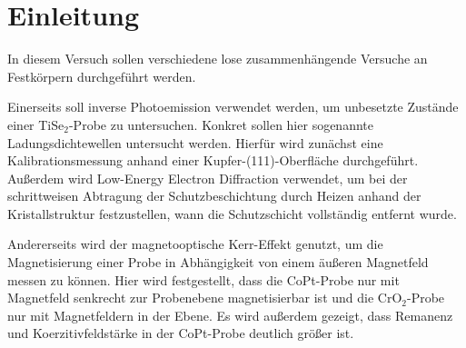 \section{Einleitung}

  In diesem Versuch sollen verschiedene lose zusammenhängende Versuche an Festkörpern durchgeführt werden.

  Einerseits soll inverse Photoemission verwendet werden, um unbesetzte Zustände einer TiSe$_2$-Probe zu untersuchen.
  Konkret sollen hier sogenannte Ladungsdichtewellen untersucht werden.
  Hierfür wird zunächst eine Kalibrationsmessung anhand einer Kupfer-(111)-Oberfläche durchgeführt.
  Außerdem wird Low-Energy Electron Diffraction verwendet, um bei der schrittweisen Abtragung der Schutzbeschichtung durch Heizen anhand der Kristallstruktur festzustellen, wann die Schutzschicht vollständig entfernt wurde.

  Andererseits wird der magnetooptische Kerr-Effekt genutzt, um die Magnetisierung einer Probe in Abhängigkeit von einem äußeren Magnetfeld messen zu können.
  Hier wird festgestellt, dass die CoPt-Probe nur mit Magnetfeld senkrecht zur Probenebene magnetisierbar ist und die CrO$_2$-Probe nur mit Magnetfeldern in der Ebene.
  Es wird außerdem gezeigt, dass Remanenz und Koerzitivfeldstärke in der CoPt-Probe deutlich größer ist.
